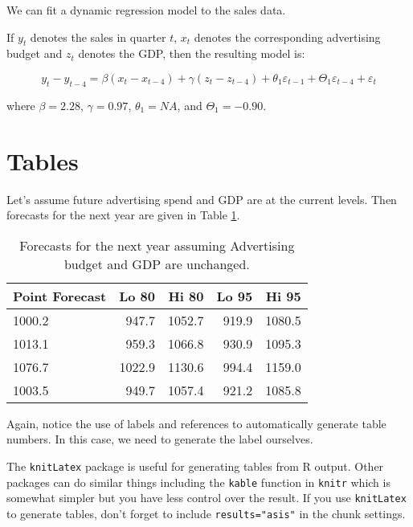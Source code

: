 \documentclass{monashthesis}
\begin{document}
We can fit a dynamic regression model to the sales data.

If \(y_t\) denotes the sales in quarter \(t\), \(x_t\) denotes the
corresponding advertising budget and \(z_t\) denotes the GDP, then the
resulting model is:

\begin{equation}
  y_t - y_{t-4} = \beta (x_t-x_{t-4}) + \gamma (z_t-z_{t-4}) + \theta_1 \varepsilon_{t-1} + \Theta_1 \varepsilon_{t-4} + \varepsilon_t
\end{equation}

where \(\beta = 2.28\), \(\gamma = 0.97\), \(\theta_1 = NA\), and
\(\Theta_1 = -0.90\).

\section{Tables}\label{tables}

Let's assume future advertising spend and GDP are at the current levels.
Then forecasts for the next year are given in Table
\ref{tab:salesforecasts}.

\begin{table}[ht]
\begin{center}
\begin{tabular}{lrrrr}
\toprule
Point Forecast & Lo 80 & Hi 80 & Lo 95 & Hi 95 \\
\midrule
1000.2 &  947.7 & 1052.7 & 919.9 & 1080.5 \\
1013.1 &  959.3 & 1066.8 & 930.9 & 1095.3 \\
1076.7 & 1022.9 & 1130.6 & 994.4 & 1159.0 \\
1003.5 &  949.7 & 1057.4 & 921.2 & 1085.8 \\
\bottomrule
\end{tabular}
\caption{Forecasts for the next year assuming Advertising budget and GDP are unchanged.}
\label{tab:salesforecasts}
\end{center}
\end{table}

Again, notice the use of labels and references to automatically generate
table numbers. In this case, we need to generate the label ourselves.

The \texttt{knitLatex} package is useful for generating tables from R
output. Other packages can do similar things including the
\texttt{kable} function in \texttt{knitr} which is somewhat simpler but
you have less control over the result. If you use \texttt{knitLatex} to
generate tables, don't forget to include \texttt{results="asis"} in the
chunk settings.
\end{document}
